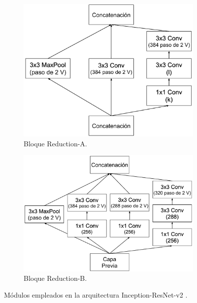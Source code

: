 \begin{figure}
    \vspace{1cm}
    \begin{subfigure}[t]{.45\textwidth}
      \centering
      \includegraphics[width=.9\linewidth]{Images/Reduction-A.png}
      \caption{Bloque Reduction-A.}
      \label{fig:Reduction-A}
    \end{subfigure}
    \hfill
    \begin{subfigure}[t]{.45\textwidth}
      \centering
      \includegraphics[width=.9\linewidth]{Images/Reduction-B.png}
      \caption{Bloque Reduction-B.}
      \label{fig:Reduction-B}
    \end{subfigure}
    \caption{Módulos empleados en la arquitectura Inception-ResNet-v2 \cite{Inception-ResNet}.}
    \label{fig:Inception-ResNet-v2Modules}
\end{figure}


